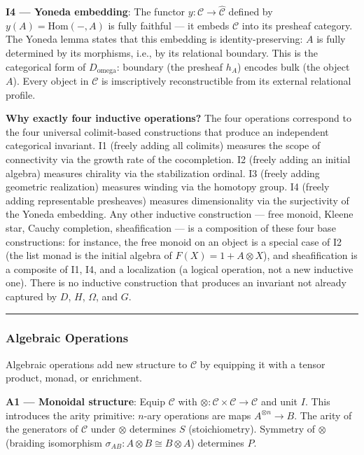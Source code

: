 \documentclass[12pt,a4paper]{article}
\begin{document}
\textbf{I4 --- Yoneda embedding}: The functor $y: \mathcal{C} \to \hat{\mathcal{C}}$ defined by $y(A) = \text{Hom}(-,A)$ is fully faithful --- it embeds $\mathcal{C}$ into its presheaf category. The Yoneda lemma states that this embedding is identity-preserving: $A$ is fully determined by its morphisms, i.e., by its relational boundary. This is the categorical form of $D_{\text{omega}}$: boundary (the presheaf $h_A$) encodes bulk (the object $A$). Every object in $\mathcal{C}$ is imscriptively reconstructible from its external relational profile.

\textbf{Why exactly four inductive operations?} The four operations correspond to the four universal colimit-based constructions that produce an independent categorical invariant. I1 (freely adding all colimits) measures the scope of connectivity via the growth rate of the cocompletion. I2 (freely adding an initial algebra) measures chirality via the stabilization ordinal. I3 (freely adding geometric realization) measures winding via the homotopy group. I4 (freely adding representable presheaves) measures dimensionality via the surjectivity of the Yoneda embedding. Any other inductive construction --- free monoid, Kleene star, Cauchy completion, sheafification --- is a composition of these four base constructions: for instance, the free monoid on an object is a special case of I2 (the list monad is the initial algebra of $F(X) = 1 + A \otimes X$), and sheafification is a composite of I1, I4, and a localization (a logical operation, not a new inductive one). There is no inductive construction that produces an invariant not already captured by $D$, $H$, $\Omega$, and $G$.

\begin{center}
\rule{0.5\textwidth}{0.4pt}
\end{center}

\subsubsection{Algebraic Operations}
Algebraic operations add new structure to $\mathcal{C}$ by equipping it with a tensor product, monad, or enrichment.

\textbf{A1 --- Monoidal structure}: Equip $\mathcal{C}$ with $\otimes: \mathcal{C} \times \mathcal{C} \to \mathcal{C}$ and unit $I$. This introduces the arity primitive: $n$-ary operations are maps $A^{\otimes n} \to B$. The arity of the generators of $\mathcal{C}$ under $\otimes$ determines $S$ (stoichiometry). Symmetry of $\otimes$ (braiding isomorphism $\sigma_{AB}: A \otimes B \cong B \otimes A$) determines $P$.
\end{document}
